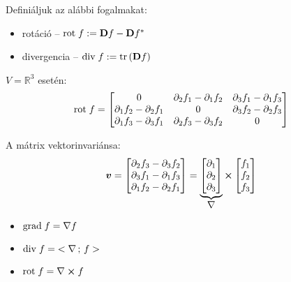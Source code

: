 \documentclass[main.tex]{subfiles}
\begin{document}
Definiáljuk az alábbi fogalmakat:
\begin{itemize}
  \item rotáció
        \tabto{2.4cm} – \tabto{3cm}
        $\mathrm{rot} \; f := \mathbf{D} f - \mathbf{D} f ^{*}$

  \item divergencia
        \tabto{2.4cm} – \tabto{3cm}
        $\mathrm{div} \; f := \tr \left( \mathbf{D} f \right)$
\end{itemize}

$V = \mathbb{R}^3$ esetén:
\begin{equation*}
  \mathrm{rot} \; f
  =
  \begin{bmatrix}
    0                               &
    \partial_2 f_1 - \partial_1 f_2 &
    \partial_3 f_1 - \partial_1 f_3
    \\
    \partial_1 f_2 - \partial_2 f_1 &
    0                               &
    \partial_3 f_2 - \partial_2 f_3
    \\
    \partial_1 f_3 - \partial_3 f_1 &
    \partial_2 f_3 - \partial_3 f_2 &
    0
  \end{bmatrix}
\end{equation*}

A mátrix vektorinvariánsa:
\begin{equation*}
  \bm{v}
  =
  \begin{bmatrix}
    \partial_2 f_3 - \partial_3 f_2 \\
    \partial_3 f_1 - \partial_1 f_3 \\
    \partial_1 f_2 - \partial_2 f_1
  \end{bmatrix}
  =
  \underbrace{
    \begin{bmatrix}
      \partial_1 \\
      \partial_2 \\
      \partial_3
    \end{bmatrix}
  }_{\displaystyle\nabla}
  \cross
  \begin{bmatrix}
    f_1 \\
    f_2 \\
    f_3
  \end{bmatrix}
\end{equation*}

\pagebreak


\begin{itemize}
  \item $\mathrm{grad} \; f = \nabla f$
  \item $\mathrm{div} \; f = \; < \nabla \, ; \, f >$
  \item $\mathrm{rot} \; f = \nabla \cross f$
\end{itemize}


\pagebreak
\end{document}

